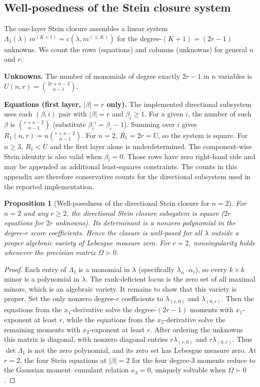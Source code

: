 \documentclass{article}
\newtheorem{proposition}{Proposition}
\theoremstyle{definition}
\begin{document}
\subsection{Well-posedness of the Stein closure system}
\label{app:stein-wellposed}

The one-layer Stein closure assembles a linear system
$\Lambda_1(\lambda)\,m^{(K+1)} = c(\lambda, m^{(\le K)})$
for the degree-$(K{+}1) = (2r{-}1)$ unknowns.
We count the rows (equations) and columns (unknowns) for
general $n$ and $r$.

\textbf{Unknowns.}
The number of monomials of degree exactly $2r{-}1$ in $n$ variables is
$U(n,r) = \binom{2r{+}n{-}2}{n{-}1}$.

\textbf{Equations (first layer, $|\beta| = r$ only).}
The implemented directional subsystem uses each $(\beta, i)$ pair with
$|\beta| = r$ and $\beta_i \ge 1$.
For a given $i$, the number of such $\beta$ is
$\binom{r{+}n{-}2}{n{-}1}$
(substitute $\beta_i' = \beta_i - 1$).
Summing over $i$ gives
$R_1(n,r) = n\binom{r{+}n{-}2}{n{-}1}$.
For $n = 2$, $R_1 = 2r = U$, so the system is square.
For $n \ge 3$, $R_1 < U$ and the first layer alone is underdetermined.
The component-wise Stein identity is also valid when $\beta_i=0$. Those
rows have zero right-hand side and may be appended as additional
least-squares constraints. The counts in this appendix are therefore
conservative counts for the directional subsystem used in the reported
implementation.

\begin{proposition}[Well-posedness of the directional Stein closure for $n{=}2$]
\label{prop:stein-closure}
For $n{=}2$ and any $r \ge 2$, the directional Stein closure subsystem is square
($2r$ equations for $2r$ unknowns). Its determinant is a nonzero
polynomial in the degree-$r$ score coefficients. Hence the closure is
well-posed for all $\lambda$ outside a proper algebraic variety of
Lebesgue measure zero.
For $r=2$, nonsingularity holds whenever the precision matrix
$\Omega \succ 0$.
\end{proposition}

\begin{proof}
Each entry of $\Lambda_1$ is a monomial in $\lambda$
(specifically $\lambda_\alpha \cdot \alpha_i$),
so every $k \times k$ minor is a polynomial in $\lambda$.
The rank-deficient locus is the zero set of all maximal minors,
which is an algebraic variety.
It remains to show that this variety is proper.
Set the only nonzero degree-$r$ coefficients to
$\lambda_{(r,0)}$ and $\lambda_{(0,r)}$.
Then the equations from the $x_1$-derivative solve the degree-$(2r{-}1)$
moments with $x_1$-exponent at least $r$, while the equations from the
$x_2$-derivative solve the remaining moments with $x_2$-exponent at least
$r$. After ordering the unknowns this matrix is diagonal, with nonzero
diagonal entries $r\lambda_{(r,0)}$ and $r\lambda_{(0,r)}$.
Thus $\det \Lambda_1$ is not the zero polynomial, and its zero set has
Lebesgue measure zero.
At $r{=}2$, the four Stein equations at $|\beta|{=}2$ for the
four degree-3 moments reduce to the Gaussian moment--cumulant
relation $\kappa_3 = 0$, uniquely solvable when $\Omega \succ 0$.
\end{proof}
\end{document}
